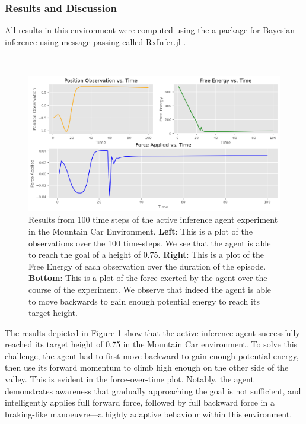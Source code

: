 \documentclass{article}
\begin{document}
\subsubsection{Results and Discussion}

All results in this environment were computed using the a package for Bayesian inference using message passing called RxInfer.jl \citep{bagaev2023rxinfer}. 

\

\begin{figure}[htbp]
    \centering
    \includegraphics[scale=0.5]{images/mountain_car_results.png}
    \caption{Results from 100 time steps of the active inference agent experiment in the Mountain Car Environment. \textbf{Left}: This is a plot of the observations over the 100 time-steps. We see that the agent is able to reach the goal of a height of 0.75. \textbf{Right}: This is a plot of the Free Energy of each observation over the duration of the episode. \textbf{Bottom}: This is a plot of the force exerted by the agent over the course of the experiment. We observe that indeed the agent is able to move backwards to gain enough potential energy to reach its target height.}
    \label{fig:mountain_car_results}
\end{figure}

The results depicted in Figure \ref{fig:mountain_car_results} show that the active inference agent successfully reached its target height of 0.75 in the Mountain Car environment. To solve this challenge, the agent had to first move backward to gain enough potential energy, then use its forward momentum to climb high enough on the other side of the valley. This is evident in the force-over-time plot. Notably, the agent demonstrates awareness that gradually approaching the goal is not sufficient, and intelligently applies full forward force, followed by full backward force in a braking-like manoeuvre—a highly adaptive behaviour within this environment.
\end{document}
